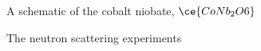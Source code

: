\documentclass[1pt]{beamer}
\begin{document}
\begin{frame}{A schematic of the cobalt niobate, $\ce{CoNb_2O6}$}


\end{frame}
\begin{frame}{The neutron scattering experiments}
\end{frame}
\end{document}

